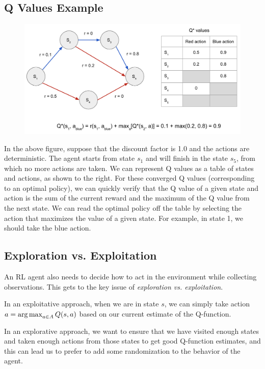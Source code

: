 \documentclass[11pt, letterpaper]{article}
\begin{document}
\subsection{Q Values Example}
\begin{figure}[!h]
  \centering
  \includegraphics[width=1.0\linewidth]{optimal_qs_example.png}
\end{figure}

In the above figure, suppose that the discount factor is 1.0 and the actions are deterministic. The agent starts from state $s_1$ and will finish in the state $s_5$, from which no more actions are taken. We can represent Q values as a table of states and actions, as shown to the right. For these converged Q values (corresponding to an optimal policy), we can quickly verify that the Q value of a given state and action is the sum of the current reward and the maximum of the Q value from the next state. We can read the optimal policy off the table by selecting the action that maximizes the value of a given state. For example, in state 1, we should take the blue action.  

\subsection{Exploration vs. Exploitation}

An RL agent also needs to decide how to act in the environment while
collecting observations. This gets to the
key issue of \emph{exploration vs. exploitation}.

In an exploitative approach, when we are in state $s$, we can simply
take action $a = \argmax_{a \in A} Q(s,a)$ based on our current
estimate of the Q-function.

In an explorative approach, we want to ensure that we have visited
enough states and taken enough actions from those states to get good
Q-function estimates, and this can lead us to prefer to add some
randomization to the behavior of the agent.
\end{document}

